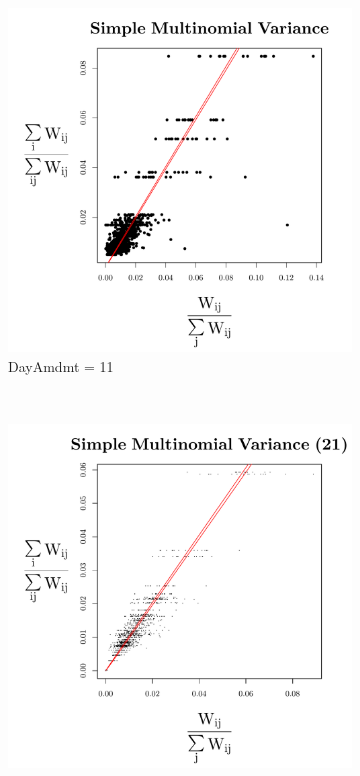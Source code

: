 \documentclass{template}
\begin{document}
\begin{figure}[ht!]
    \centering
    \begin{subfigure}[b]{0.40\textheight}
        \includegraphics[width=\textwidth]{Images/simpleMult11.pdf}
        \caption{DayAmdmt = 11}
    \end{subfigure}
\\
    \begin{subfigure}[b]{0.40\textheight}
        \includegraphics[width=\textwidth]{Images/simpleMult21.pdf}

\end{subfigure}
\end{figure}
\end{document}
